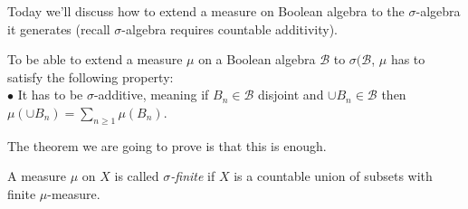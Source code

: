 \documentclass[a4paper]{article}
\begin{document}
Today we'll discuss how to extend a measure on Boolean algebra to the $\sigma$-algebra it generates (recall $\sigma$-algebra requires countable additivity).

To be able to extend a measure $\mu$ on a Boolean algebra $\mathcal{B}$ to $\sigma(\mathcal{B}$, $\mu$ has to satisfy the following property:\\
$\bullet$ It has to be $\sigma$-additive, meaning if $B_n \in \mathcal{B}$ disjoint and $\cup B_n \in \mathcal{B}$ then $\mu(\cup B_n) = \sum_{n \geq 1} \mu(B_n)$.

The theorem we are going to prove is that this is enough.

\begin{defi}
A measure $\mu$ on $X$ is called \emph{$\sigma$-finite} if $X$ is a countable union of subsets with finite $\mu$-measure.
\end{defi}
\end{document}
